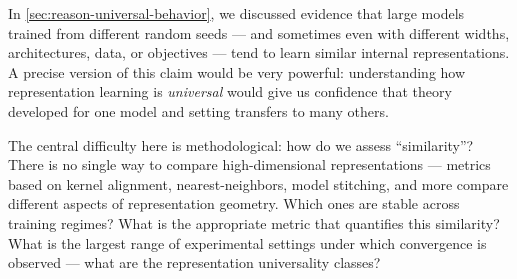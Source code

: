 \begin{opendirection}
\label{openquestion:comparing-models}


In \cref{sec:reason-universal-behavior}, we discussed evidence that large models trained from different random seeds --- and sometimes even with different widths, architectures, data, or objectives --- tend to learn similar internal representations.
A precise version of this claim would be very powerful: understanding how representation learning is \emph{universal} would give us confidence that theory developed for one model and setting transfers to many others.


The central difficulty here is methodological: how do we assess ``similarity''?
There is no single way to compare high-dimensional representations --- metrics based on kernel alignment, nearest-neighbors, model stitching, and more compare different aspects of representation geometry. Which ones are stable across training regimes? What is the appropriate metric that quantifies this similarity? What is the largest range of experimental settings under which convergence is observed --- what are the representation universality classes?

\end{opendirection}
